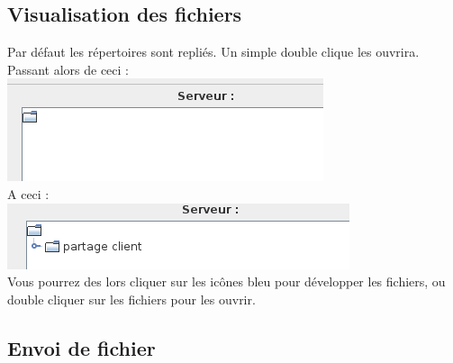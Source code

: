 \documentclass[12pt,a4paper]{article}
\begin{document}
\subsection{Visualisation des fichiers}
\begin{center}
	Par défaut les répertoires sont repliés. Un simple double clique les ouvrira. \\
	Passant alors de ceci : \\
	\includegraphics[scale=0.5]{images/fichier.png} \\

	A ceci : \\
	\includegraphics[scale=0.5]{images/dev.png} \\
	
	Vous pourrez des lors cliquer sur les icônes bleu pour développer les fichiers, ou double cliquer sur les fichiers pour les ouvrir.
	
\end{center}

\subsection{Envoi de fichier}
\end{document}
